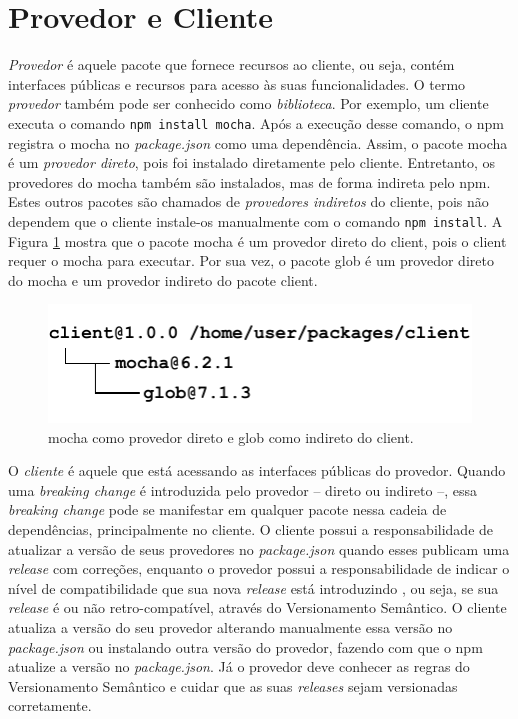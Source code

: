 \section{Provedor e Cliente}
\label{ref-teo:prov_clie}
\textit{Provedor} é aquele pacote que fornece recursos ao cliente, ou seja, contém interfaces públicas e recursos para acesso às suas funcionalidades. O termo \textit{provedor} também pode ser conhecido como \textit{biblioteca}. Por exemplo, um cliente executa o comando \texttt{npm install mocha}. Após a execução desse comando, o \textsf{npm} registra o \textsf{mocha} no \textit{package.json} como uma dependência. Assim, o pacote \textsf{mocha} é um \textit{provedor direto}, pois foi instalado diretamente pelo cliente. Entretanto, os provedores do \textsf{mocha} também são instalados, mas de forma indireta pelo \textsf{npm}. Estes outros pacotes são chamados de \textit{provedores indiretos} do cliente, pois não dependem que o cliente instale-os manualmente com o comando \texttt{npm install}. A Figura \ref{fig:provider} mostra que o pacote \textsf{mocha} é um provedor direto do \textsf{client}, pois o \textsf{client} requer o \textsf{mocha} para executar. Por sua vez, o pacote \textsf{glob} é um provedor direto do \textsf{mocha} e um provedor indireto do pacote \textsf{client}.

\begin{figure}
    \centering
    \includegraphics[scale=1.4]{figuras/provider_directly_undirectly.pdf}
    \caption{\textsf{mocha} como provedor direto e \textsf{glob} como indireto do \textsf{client}.}
    \label{fig:provider}
\end{figure}{}

O \textit{cliente} é aquele que está acessando as interfaces públicas do provedor. Quando uma \textit{breaking change} é introduzida pelo provedor -- direto ou indireto --, essa \textit{breaking change} pode se manifestar em qualquer pacote nessa cadeia de dependências, principalmente no cliente. O cliente possui a responsabilidade de atualizar a versão de seus provedores no \textit{package.json} quando esses publicam uma \textit{release} com correções, enquanto o provedor possui a responsabilidade de indicar o nível de compatibilidade que sua nova \textit{release} está introduzindo \cite{teorical_reference:semver}, ou seja, se sua \textit{release} é ou não retro-compatível, através do Versionamento Semântico. O cliente atualiza a versão do seu provedor alterando manualmente essa versão no \textit{package.json} ou instalando outra versão do provedor, fazendo com que o \textsf{npm} atualize a versão no \textit{package.json}. Já o provedor deve conhecer as regras do Versionamento Semântico e cuidar que as suas \textit{releases} sejam versionadas corretamente.

